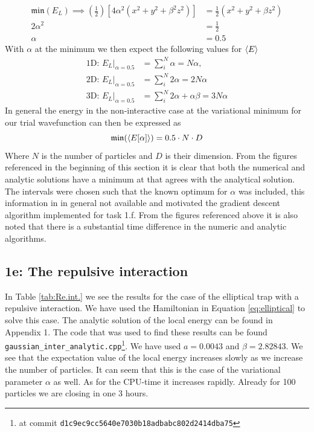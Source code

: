 \begin{align}
\mathfrak{min}(E_L)  \implies \left(\frac{1}{2}\right)[4\alpha^2 (x^2 + y^2 + \beta^2 z^2) ] &= \frac{1}{2} (x^2 + y^2 + \beta z^2) \\
 2 \alpha ^2  &= \frac{1}{2} \\
 \alpha &= 0.5
\end{align}
With $\alpha$ at the minimum we then expect the following values for $\langle E \rangle$
\begin{equation}
\begin{split}
\text{1D: }E_L |_{\alpha = 0.5} &= \sum_i^N \alpha = N \alpha,\\
\text{2D: }E_L|_{\alpha = 0.5} &= \sum_i^N  2\alpha = 2N \alpha \\
\text{3D: }E_L|_{\alpha = 0.5} &= \sum_i^N  2\alpha + \alpha \beta  = 3N\alpha
\end{split}
\end{equation}
In general the energy in the non-interactive case at the variational minimum for our trial wavefunction can then be expressed as 
\begin{equation}
\mathfrak{min}(\langle E[\alpha] \rangle) = 0.5 \cdot N \cdot D  
\end{equation}
Where $N$ is the number of particles and $D$ is their dimension. From the figures referenced in the beginning of this section it is clear that both the numerical and analytic solutions have a minimum at that  agrees with the analytical solution. The intervals  were chosen such that the known optimum for $\alpha$ was included, this information in in general not available and motivated the gradient descent algorithm implemented for task 1.f. From the figures referenced above it is also noted that there is a substantial time difference in the numeric and analytic algorithms. 

\subsection*{\textbf{1e:} The repulsive interaction}


In Table \ref{tab:Re.int.} we see the results for the case of the elliptical trap with a repulsive interaction. We have used the Hamiltonian in Equation \ref{eq:elliptical} to solve this case. The analytic solution of the local energy can be found in Appendix 1. The code that was used to find these results can be found \lstinline{gaussian_inter_analytic.cpp}\footnote{at commit \lstinline{d1c9ec9cc5640e7030b18adbabc802d2414dba75}}.
We have used $a = 0.0043$ and $\beta = 2.82843$. We see that the expectation value of the local energy increases slowly as we increase the number of particles. It can seem that this is the case of the variational parameter $\alpha$ as well. 
As for the CPU-time it increases rapidly. Already for 100 particles we are closing in one 3 hours.


